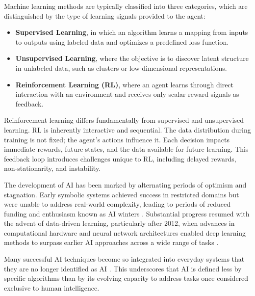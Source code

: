 Machine learning methods are typically classified into three categories, which are distinguished by the type of learning signals provided to the agent:

\begin{itemize}

  \item \textbf{Supervised Learning}, in which an algorithm learns a mapping from inputs to outputs using labeled data and optimizes a predefined loss function.

  \item \textbf{Unsupervised Learning}, where the objective is to discover latent structure in unlabeled data, such as clusters or low-dimensional representations.

  \item \textbf{Reinforcement Learning (RL)}, where an agent learns through direct interaction with an environment and receives only scalar reward signals as feedback.

\end{itemize}

Reinforcement learning differs fundamentally from supervised and unsupervised learning. RL is inherently interactive and sequential. The data distribution during training is not fixed; the agent's actions influence it. Each decision impacts immediate rewards, future states, and the data available for future learning. This feedback loop introduces challenges unique to RL, including delayed rewards, non-stationarity, and instability.

The development of AI has been marked by alternating periods of optimism and stagnation. Early symbolic systems achieved success in restricted domains but were unable to address real-world complexity, leading to periods of reduced funding and enthusiasm known as AI winters \cite{crevier1993, russell2021, nrc1999}. Substantial progress resumed with the advent of data-driven learning, particularly after 2012, when advances in computational hardware and neural network architectures enabled deep learning methods to surpass earlier AI approaches across a wide range of tasks \cite{russell2021, goldman2022, mckinsey2018}.

Many successful AI techniques become so integrated into everyday systems that they are no longer identified as AI \cite{cnn2006, kaplan2019}. This underscores that AI is defined less by specific algorithms than by its evolving capacity to address tasks once considered exclusive to human intelligence.

